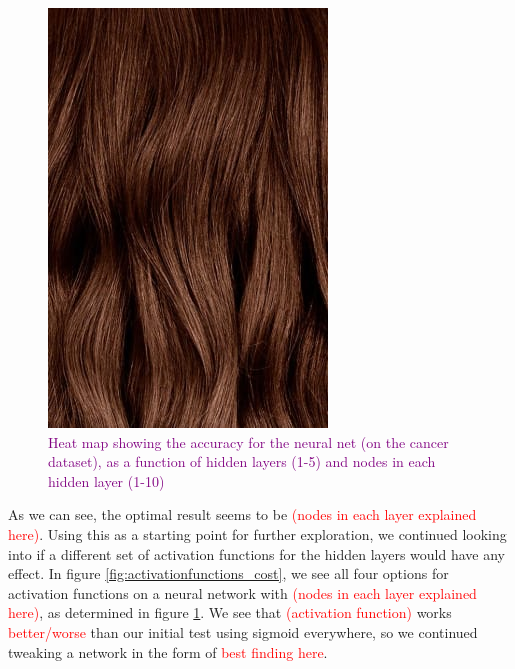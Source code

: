 
\begin{figure}
    \centering
    \includegraphics[width=0.5\linewidth]{figures/placeholders/gridsearch_layers_nodes.png}
    \caption{\textcolor{purple}{Heat map showing the accuracy for the neural net (on the cancer dataset), as a function of hidden layers (1-5) and nodes in each hidden layer (1-10)}}
    \label{fig:gridsearch_layers_nodes}
\end{figure}

As we can see, the optimal result seems to be \textcolor{red}{(nodes in each layer explained here)}. Using this as a starting point for further exploration, we continued looking into if a different set of activation functions for the hidden layers would have any effect. In figure \ref{fig:activationfunctions_cost}, we see all four options for activation functions on a neural network with \textcolor{red}{(nodes in each layer explained here)}, as determined in figure \ref{fig:gridsearch_layers_nodes}. We see that \textcolor{red}{(activation function)} works \textcolor{red}{better/worse} than our initial test using sigmoid everywhere, so we continued tweaking a network in the form of \textcolor{red}{best finding here}.

